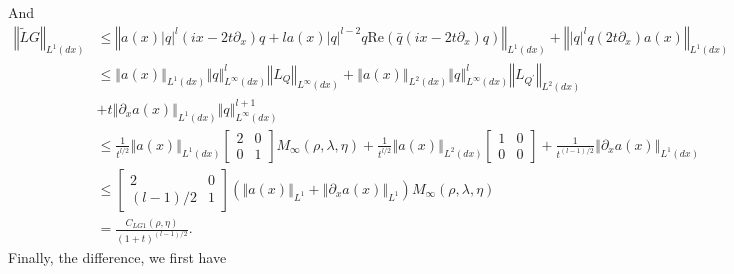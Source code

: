 \documentclass{amsart}
\theoremstyle{plain}
\theoremstyle{remark}
\numberwithin{equation}{section}
\newcommand{\norm}[2]{\left\Vert #1\right\Vert_{#2}}
\newcommand{\Twomat}[4]
{
\left[
	\begin{array}{cc}
		{#1}	&	{#2}	\\[10pt]
		{#3}	&	{#4}
		\end{array}
\right]
}
\begin{document}
And
{\small \begin{align}
\label{est:LG1}
\left\Vert \tilde{L}G\right\Vert _{L^{1}\left( dx\right) } &\leq \left\Vert
a\left( x\right) \left\vert q\right\vert ^{l}\left( ix-2t\partial
_{x}\right) q+l a\left( x\right) \left\vert q\right\vert ^{l-2}q\mathrm{Re}
\left( \bar{q}\left( ix-2t\partial _{x}\right) q\right) \right\Vert
_{L^{1}\left( dx\right) }+\left\Vert \left\vert q\right\vert ^{l}q\left(
2t\partial _{x}\right) a\left( x\right) \right\Vert _{L^{1}\left(
dx\right) } \\
\nonumber
&\leq \left\Vert a\left( x\right) \right\Vert _{L^{1}\left( dx\right)
}\left\Vert q\right\Vert _{L^{\infty }\left( dx\right) }^{l}\left\Vert
L_{Q}\right\Vert _{L^{\infty }\left( dx\right) }+\left\Vert a\left( x\right)
\right\Vert _{L^{2}\left( dx\right) }\left\Vert q\right\Vert _{L^{\infty
}\left( dx\right) }^{l}\left\Vert L_{Q^{\prime }}\right\Vert _{L^{2}\left(
dx\right) }\\
\nonumber
&  +t\left\Vert
\partial _{x}a\left( x\right) \right\Vert _{L^{1}\left( dx\right)
}\left\Vert q\right\Vert _{L^{\infty }\left( dx\right) }^{l+1} \\
\nonumber
&\leq \frac{1}{t^{l/2}} \left\Vert  a\left( x\right) \right\Vert _{L^{1}\left( dx\right) }  \Twomat{2}{0}{0}{1}M_{\infty}(\rho,\lambda, \eta)+ \frac{1}{t^{l/2}}\left\Vert a\left( x\right) \right\Vert
_{L^{2}\left( dx\right) } \Twomat{1}{0}{0}{0}+\frac{1}{t^{(l-1)/2}}\left\Vert \partial _{x}a\left( x\right) \right\Vert _{L^{1}\left(
dx\right) }\\
\nonumber
&\leq   \Twomat{2}{0}{{(l-1)/2}}{1}\left(\norm{a(x)}{L^1}+\norm{\partial_x a(x)}{L^1}\right)M_{\infty}(\rho,\lambda, \eta)\\
\nonumber
&=\frac{C_{LG1}(\rho, \eta)}{(1+t)^{(l-1)/2}}.
\end{align}}
Finally, the difference, we first have
\end{document}

